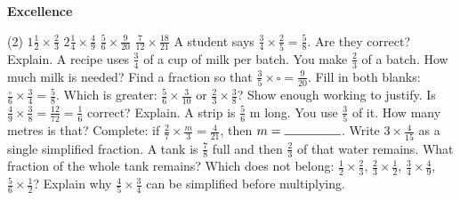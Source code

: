 \documentclass[17pt,a4paper,landscape]{extarticle}
\begin{document}
\sffamily
\boldmath

\boldmath

\vspace*{0.4em}
{\LARGE \textbf{Excellence}}
\begin{tasks}(2)
\task \mbox{$1\frac{1}{2}\times\frac{2}{3}$}
\task \mbox{$2\frac{1}{4}\times\frac{4}{9}$}
\task \mbox{$\frac{5}{6}\times\frac{9}{20}$}
\task \mbox{$\frac{7}{12}\times\frac{18}{21}$}
\task A student says \mbox{$\frac{3}{4}\times\frac{2}{5}=\frac{5}{8}$}. Are they correct? Explain.
\task A recipe uses \mbox{$\frac{3}{4}$} of a cup of milk per batch. You make \mbox{$\frac{2}{3}$} of a batch. How much milk is needed?
\task Find a fraction so that \mbox{$\frac{3}{5}\times\square=\frac{9}{20}$}.
\task Fill in both blanks: \mbox{$\frac{\square}{6}\times\frac{3}{4}=\frac{5}{8}$}.
\task Which is greater: \mbox{$\frac{5}{6}\times\frac{3}{10}$} or \mbox{$\frac{2}{3}\times\frac{3}{8}$}? Show enough working to justify.
\task Is \mbox{$\frac{4}{9}\times\frac{3}{8}=\frac{12}{72}=\frac{1}{6}$} correct? Explain.
\task A strip is \mbox{$\frac{5}{6}$} m long. You use \mbox{$\frac{3}{5}$} of it. How many metres is that?
\task Complete: if \mbox{$\frac{2}{7}\times\frac{m}{3}=\frac{4}{21}$}, then \mbox{$m=\rule{1.6cm}{0.15mm}$}.
\task Write \mbox{$3\times\frac{4}{15}$} as a single simplified fraction.
\task A tank is \mbox{$\frac{7}{8}$} full and then \mbox{$\frac{2}{3}$} of that water remains. What fraction of the whole tank remains?
\task Which does not belong: \mbox{$\frac{1}{2}\times\frac{2}{3}$}, \mbox{$\frac{2}{3}\times\frac{1}{2}$}, \mbox{$\frac{3}{4}\times\frac{4}{9}$}, \mbox{$\frac{5}{6}\times\frac{1}{2}$}?
\task Explain why \mbox{$\frac{4}{5}\times\frac{3}{4}$} can be simplified before multiplying.
\end{tasks}
\end{document}
